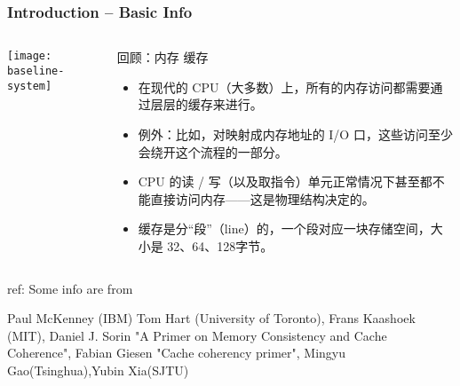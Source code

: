 %
%
\begin{frame}[plain]
	\frametitle{Introduction -- Basic Info}
	\begin{columns}
		\begin{column}{.4\textwidth}
			\centering
			
			\texttt{[image: baseline-system]}
		\end{column}
		\begin{column}{.6\textwidth}
		回顾：内存 缓存
			\begin{itemize}
				\item 在现代的 CPU（大多数）上，所有的内存访问都需要通过层层的缓存来进行。
				\item 例外：比如，对映射成内存地址的 I/O 口，这些访问至少会绕开这个流程的一部分。
				\item CPU 的读 / 写（以及取指令）单元正常情况下甚至都不能直接访问内存——这是物理结构决定的。
				\item 缓存是分“段”（line）的，一个段对应一块存储空间，大小是 32、64、128字节。
			\end{itemize}
			
		\end{column}
	\end{columns}

\raggedright
\tiny ref:
Some info are from

Paul McKenney (IBM) Tom Hart (University of Toronto), Frans Kaashoek (MIT), 
Daniel J. Sorin "A Primer on Memory Consistency and Cache Coherence",  Fabian Giesen "Cache coherency primer", Mingyu Gao(Tsinghua),Yubin Xia(SJTU)	
	
\end{frame}

